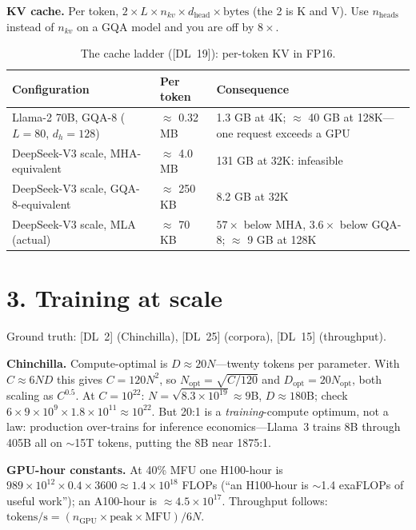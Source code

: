 \textbf{KV cache.} Per token, $2 \times L \times n_{kv} \times d_{\text{head}}
\times \text{bytes}$ (the 2 is K and V). Use $n_{\text{heads}}$ instead of
$n_{kv}$ on a GQA model and you are off by $8\times$.

\begin{table}[H]
\centering
\small
\caption{The cache ladder ([DL~19]): per-token KV in FP16.}
\begin{tabularx}{\textwidth}{@{}llX@{}}
\toprule
\textbf{Configuration} & \textbf{Per token} & \textbf{Consequence} \\
\midrule
Llama-2 70B, GQA-8 ($L{=}80$, $d_h{=}128$) & $\approx$ 0.32 MB & 1.3 GB at 4K; $\approx$ 40 GB at 128K---one request exceeds a GPU \\
DeepSeek-V3 scale, MHA-equivalent & $\approx$ 4.0 MB & 131 GB at 32K: infeasible \\
DeepSeek-V3 scale, GQA-8-equivalent & $\approx$ 250 KB & 8.2 GB at 32K \\
DeepSeek-V3 scale, MLA (actual) & $\approx$ 70 KB & $57\times$ below MHA, $3.6\times$ below GQA-8; $\approx$ 9 GB at 128K \\
\bottomrule
\end{tabularx}
\end{table}

\section*{3. Training at scale}

\noindent Ground truth: [DL~2] (Chinchilla), [DL~25] (corpora), [DL~15]
(throughput).

\textbf{Chinchilla.} Compute-optimal is $D \approx 20N$---twenty tokens per
parameter. With $C \approx 6ND$ this gives $C = 120N^{2}$, so
$N_{\text{opt}} = \sqrt{C/120}$ and $D_{\text{opt}} = 20N_{\text{opt}}$, both
scaling as $C^{0.5}$. At $C = 10^{22}$: $N = \sqrt{8.3{\times}10^{19}} \approx
9$B, $D \approx 180$B; check $6 \times 9{\times}10^{9} \times 1.8{\times}10^{11}
\approx 10^{22}$. But 20:1 is a \emph{training}-compute optimum, not a law:
production over-trains for inference economics---Llama~3 trains 8B through 405B
all on $\sim$15T tokens, putting the 8B near 1875:1.

\textbf{GPU-hour constants.} At 40\% MFU one H100-hour is
$989{\times}10^{12} \times 0.4 \times 3600 \approx 1.4{\times}10^{18}$ FLOPs
(``an H100-hour is $\sim$1.4 exaFLOPs of useful work''); an A100-hour is
$\approx 4.5{\times}10^{17}$. Throughput follows:
$\text{tokens/s} = (n_{\text{GPU}} \times \text{peak} \times \text{MFU})/6N$.

